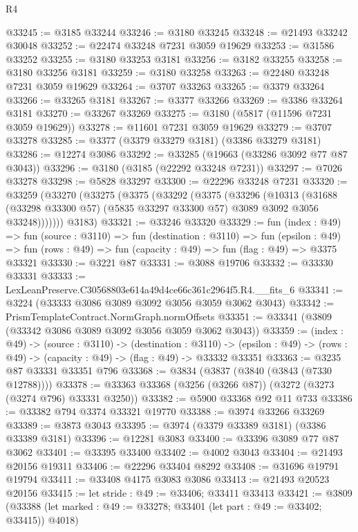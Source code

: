 \begin{lexlean}{R4}
\begin{coremodule}
@33245 := @3185 @33244
@33246 := @3180 @33245
@33248 := @21493 @33242 @30048
@33252 := @22474 @33248 @7231 @3059 @19629
@33253 := @31586 @33252
@33255 := @3180 @33253 @3181
@33256 := @3182 @33255
@33258 := @3180 @33256 @3181
@33259 := @3180 @33258
@33263 := @22480 @33248 @7231 @3059 @19629
@33264 := @3707 @33263
@33265 := @3379 @33264
@33266 := @33265 @3181
@33267 := @3377 @33266
@33269 := @3386 @33264 @3181
@33270 := @33267 @33269
@33275 := @3180 (@5817 (@11596 @7231 @3059 @19629))
@33278 := @11601 @7231 @3059 @19629
@33279 := @3707 @33278
@33285 := @3377 (@3379 @33279 @3181) (@3386 @33279 @3181)
@33286 := @12274 @3086
@33292 := @33285 (@19663 (@33286 @3092 @77 @87 @3043))
@33296 := @3180 (@3185 (@22292 @33248 @7231))
@33297 := @7026 @33278
@33298 := @5828 @33297
@33300 := @22296 @33248 @7231
@33320 := @33259
    (@33270
      (@33275
        (@3375
          (@33292
            (@3375
              (@33296
                (@10313
                  (@31688
                    (@33298 @33300 @57)
                    (@5835 @33297 @33300 @57)
                    @3089
                    @3092
                    @3056
                    @33248)))))))
      @3183)
@33321 := @33246 @33320
@33329 := fun (index : @49) =>
  fun (source : @3110) =>
  fun (destination : @3110) =>
  fun (epsilon : @49) =>
  fun (rows : @49) => fun (capacity : @49) => fun (flag : @49) => @3375 @33321
@33330 := @3221 @87
@33331 := @3088 @19706
@33332 := @33330 @33331
@33333 := LexLeanPreserve.C30568803e614a49d4ce66c361c2964f5.R4.__fits_6
@33341 := @3224 (@33333 @3086 @3089 @3092 @3056 @3059 @3062 @3043)
@33342 := PrismTemplateContract.NormGraph.normOffsets
@33351 := @33341 (@3809 (@33342 @3086 @3089 @3092 @3056 @3059 @3062 @3043))
@33359 := (index : @49) ->
  (source : @3110) ->
  (destination : @3110) ->
  (epsilon : @49) -> (rows : @49) -> (capacity : @49) -> (flag : @49) -> @33332 @33351
@33363 := @3235 @87 @33331 @33351 @796
@33368 := @3834 (@3837 (@3840 (@3843 (@7330 @12788))))
@33378 := @33363 @33368 (@3256 (@3266 @87)) (@3272 (@3273 (@3274 @796) @33331 @3250))
@33382 := @5900 @33368 @92 @11 @733
@33386 := @33382 @794 @3374 @33321 @19770
@33388 := @3974 @33266 @33269
@33389 := @3873 @3043
@33395 := @3974 (@3379 @33389 @3181) (@3386 @33389 @3181)
@33396 := @12281 @3083
@33400 := @33396 @3089 @77 @87 @3062
@33401 := @33395 @33400
@33402 := @4002 @3043
@33404 := @21493 @20156 @19311
@33406 := @22296 @33404 @8292
@33408 := @31696 @19791 @19794
@33411 := @33408 @4175 @3083 @3086
@33413 := @21493 @20523 @20156
@33415 := let stride : @49 := @33406; @33411 @33413
@33421 := @3809
    (@33388 (let marked : @49 := @33278; @33401 (let part : @49 := @33402; @33415)) @4018)

\end{coremodule}
\end{lexlean}
